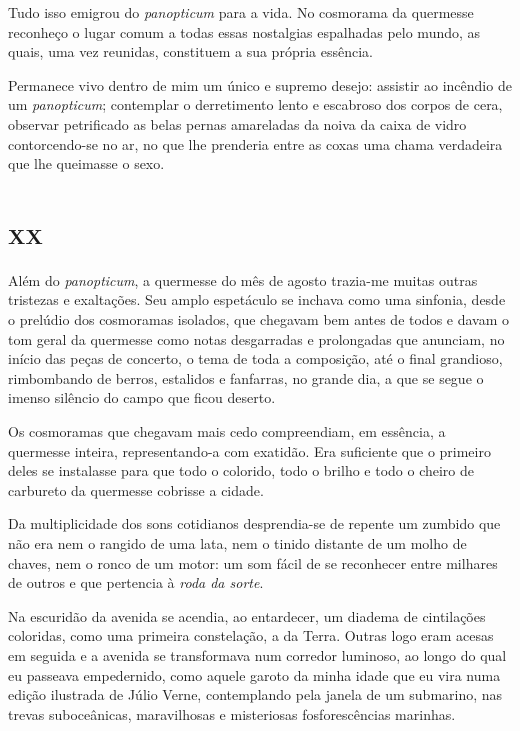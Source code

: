 Tudo isso emigrou do \textit{panopticum} para a vida. No cosmorama da quermesse reconheço o lugar comum a todas essas nostalgias espalhadas pelo mundo, as quais, uma vez reunidas, constituem a sua própria essência.

Permanece vivo dentro de mim um único e supremo desejo: assistir ao incêndio de um \textit{panopticum}; contemplar o derretimento lento e escabroso dos corpos de cera, observar petrificado as belas pernas amareladas da noiva da caixa de vidro contorcendo-se no ar, no que lhe prenderia entre as coxas uma chama verdadeira que lhe queimasse o sexo.


\chapter*{\huge\centering\textsc{xx}}

Além do \textit{panopticum}, a quermesse do mês de agosto trazia-me muitas outras tristezas e exaltações. Seu amplo espetáculo se inchava como uma sinfonia, desde o prelúdio dos cosmoramas isolados, que chegavam bem antes de todos e davam o tom geral da quermesse como notas desgarradas e prolongadas que anunciam, no início das peças de concerto, o tema de toda a composição, até o final grandioso, rimbombando de berros, estalidos e fanfarras, no grande dia, a que se segue o imenso silêncio do campo que ficou deserto.

Os cosmoramas que chegavam mais cedo compreendiam, em essência, a quermesse inteira, representando-a com exatidão. Era suficiente que o primeiro deles se instalasse para que todo o colorido, todo o brilho e todo o cheiro de carbureto da quermesse cobrisse a cidade.

Da multiplicidade dos sons cotidianos desprendia-se de repente um zumbido que não era nem o rangido de uma lata, nem o tinido distante de um molho de chaves, nem o ronco de um motor: um som fácil de se reconhecer entre milhares de outros e que pertencia à \textit{roda da sorte}.

Na escuridão da avenida se acendia, ao entardecer, um diadema de cintilações coloridas, como uma primeira constelação, a da Terra. Outras logo eram acesas em seguida e a avenida se transformava num corredor luminoso, ao longo do qual eu passeava empedernido, como aquele garoto da minha idade que eu vira numa edição ilustrada de Júlio Verne, contemplando pela janela de um submarino, nas trevas suboceânicas, maravilhosas e misteriosas fosforescências marinhas.

